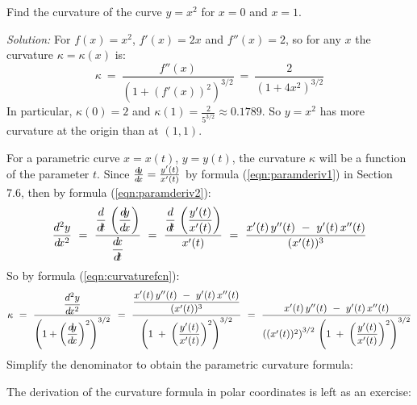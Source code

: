 \begin{exmp}
\noindent Find the curvature of the curve $y=x^2$ for $x=0$ and
$x=1$.\vspace{1mm}
\par\noindent\emph{Solution:} For $f(x)=x^2$, $f'(x)=2x$ and $f''(x)=2$, so for
any $x$ the curvature $\kappa=\kappa(x)$ is:
\[
\kappa ~=~ \frac{f''(x)}{(1 + (f'(x))^2)^{3/2}} ~=~ \frac{2}{(1+4x^2)^{3/2}}
\]
In particular, $\kappa(0)=2$ and $\kappa(1)=\frac{2}{5^{3/2}} \approx 0.1789$.
So $y=x^2$ has more curvature at the origin than at $(1,1)$.
\end{exmp}
\divider
\newpage
For a parametric curve $x=x(t)$, $y=y(t)$, the curvature $\kappa$ will be a
function of the parameter $t$. Since $\frac{d\negmedspace y}{d\!x} = \frac{y'(t)}{x'(t)}$ by formula
(\ref{eqn:paramderiv1}) in Section 7.6, then by formula (\ref{eqn:paramderiv2}):
\[
\frac{d^2y}{d\!x^2} ~=~ \frac{\dfrac{d}{d\!t}\,\left(\dfrac{d\negmedspace y}{d\!x}\right)}{\dfrac{d\negmedspace x}{d\!t}} ~=~
\frac{\dfrac{d}{d\!t}\,\left(\dfrac{y'(t)}{x'(t)}\right)}{x'(t)} ~=~
\frac{x'(t)\,y''(t) ~-~ y'(t)\,x''(t)}{(x'(t))^3}
\]
So by formula (\ref{eqn:curvaturefcn}):
\[
\kappa ~=~ \frac{\dfrac{d^2y}{d\!x^2}}{\left(1 + \left(\dfrac{d\negmedspace y}{d\!x}\right)^2\right)^{3/2}} ~=~
\frac{\dfrac{x'(t)\,y''(t) ~-~ y'(t)\,x''(t)}{(x'(t))^3}}{\left(1 \;+\;
\left(\dfrac{y'(t)}{x'(t)}\right)^2\right)^{3/2}} ~=~
\frac{x'(t)\,y''(t) ~-~ y'(t)\,x''(t)}{\left((x'(t))^2\right)^{3/2} \,\left(1 \;+\;
\left(\dfrac{y'(t)}{x'(t)}\right)^2\right)^{3/2}}
\]
Simplify the denominator to obtain the parametric curvature formula:


\noindent The derivation of the curvature formula in polar coordinates is left
as an exercise:


